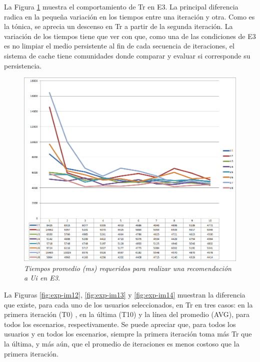 La Figura \ref{fig:exp-im11} muestra el comportamiento de Tr en E3. La principal diferencia radica en la pequeña variación en los tiempos entre una iteración y otra. Como es la tónica, se aprecia un descenso en Tr a partir de la segunda iteración. La variación de los tiempos tiene que ver con que, como una de las condiciones de E3 es no limpiar el medio persistente al fin de cada secuencia de iteraciones, el sistema de cache tiene comunidades donde comparar y evaluar si corresponde su persistencia.

\begin{figure}[H]
  \centering
  \includegraphics[scale=.7]{images/Figura5-11}
  \caption{\em Tiempos promedio (ms) requeridos para realizar una recomendación a Ui en E3.}
  \label{fig:exp-im11}
\end{figure}

La Figuras \ref{fig:exp-im12}, \ref{fig:exp-im13} y \ref{fig:exp-im14} muestran la diferencia que existe, para cada uno de los usuarios seleccionados, en Tr en tres casos: en la primera iteración (T0) , en la última (T10) y la línea del promedio (AVG), para todos los escenarios, respectivamente. Se puede apreciar que, para todos los usuarios y en todos los escenarios, siempre la primera iteración toma más Tr que la última, y más aún, que el promedio de iteraciones es menos costoso que la primera iteración. 

